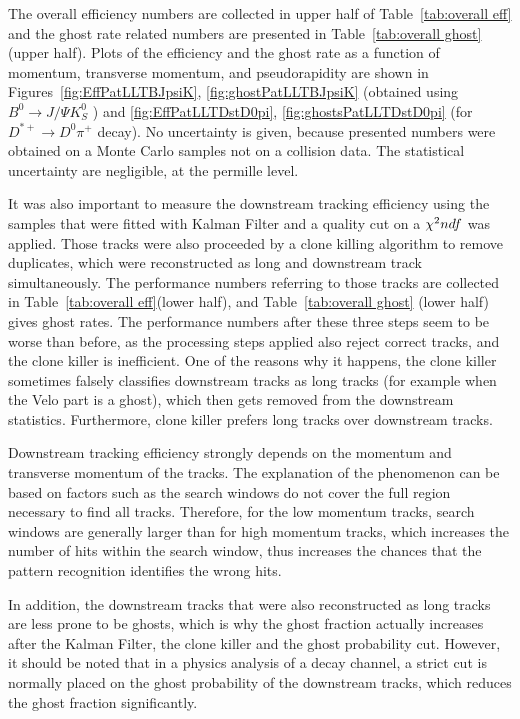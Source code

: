 The overall efficiency numbers are collected in upper half of Table~\ref{tab:overall eff} and the ghost rate related numbers are presented in Table~\ref{tab:overall ghost} (upper half). Plots of the efficiency and the ghost rate as a function of momentum, transverse momentum, and pseudorapidity are shown in 
Figures~\ref{fig:EffPatLLTBJpsiK}, \ref{fig:ghostPatLLTBJpsiK}  (obtained using  $B^{0} \rightarrow J/\Psi K^{0}_{S}$ ) and \ref{fig:EffPatLLTDstD0pi}, \ref{fig:ghostsPatLLTDstD0pi} (for $D^{*+} \rightarrow D^{0}\pi^+$ decay). No uncertainty is given, because presented numbers were obtained on a Monte Carlo samples not on a collision data. The statistical uncertainty are negligible, at the permille level.  

It was also important to measure the downstream tracking efficiency using the samples that were fitted with Kalman Filter and a quality cut on a $\chi^2\/ndf$ was applied. Those tracks were also proceeded by a clone killing algorithm to remove duplicates, which were reconstructed as long and downstream track simultaneously. The performance numbers referring to those tracks are collected in Table~\ref{tab:overall eff}(lower half), and Table~\ref{tab:overall ghost} (lower half) gives ghost rates. The performance numbers after these three steps seem to be worse than before, as the processing steps applied also reject correct tracks, and the clone killer is inefficient. One of the reasons why it happens, the clone killer sometimes falsely classifies downstream tracks as long tracks (for example when the Velo part is a ghost), which then gets removed from the downstream statistics. Furthermore, clone killer prefers long tracks over downstream tracks. 

Downstream tracking efficiency strongly depends on the momentum and transverse momentum of the tracks. The explanation of the phenomenon can be based on factors such as the search windows do not cover the full region necessary to find all tracks. Therefore, for the low momentum tracks, search windows are generally larger than for high momentum tracks, which increases the number of hits within the search window, thus increases the chances that the pattern recognition identifies the wrong hits.

In addition, the downstream tracks that were also reconstructed as long tracks
are less prone to be ghosts, which is why the ghost fraction actually increases
after the Kalman Filter, the clone killer and the ghost probability cut. However, it should be noted that
in a physics analysis of a decay channel, a strict cut is normally placed on the ghost probability of the downstream tracks, which reduces the ghost fraction
significantly.



